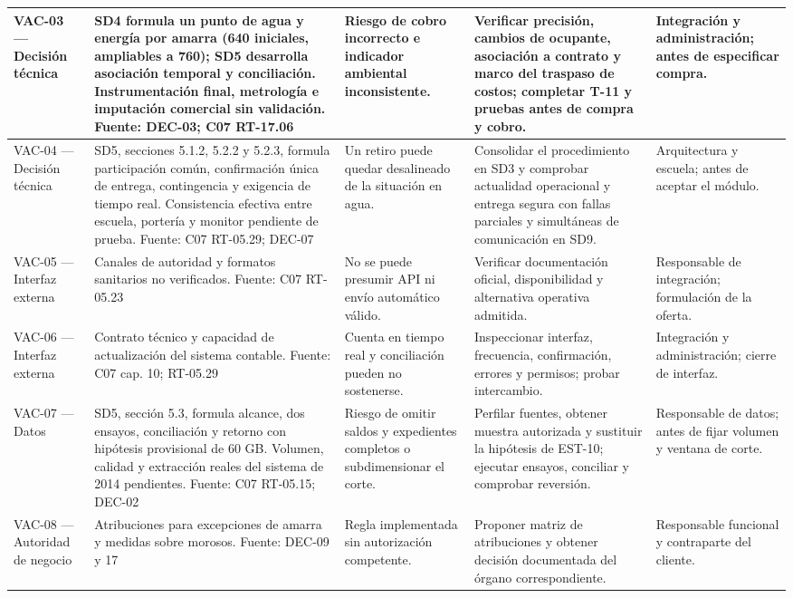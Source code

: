 \begin{longtable}{|L{0.116466\AnchoTablaAnexo}|L{0.297189\AnchoTablaAnexo}|L{0.168675\AnchoTablaAnexo}|L{0.281124\AnchoTablaAnexo}|L{0.136546\AnchoTablaAnexo}|}
VAC-03 — Decisión técnica & SD4 formula un punto de agua y energía por amarra (640 iniciales, ampliables a 760); SD5 desarrolla asociación temporal y conciliación. Instrumentación final, metrología e imputación comercial sin validación. Fuente: DEC-03; C07 RT-17.06 & Riesgo de cobro incorrecto e indicador ambiental inconsistente. & Verificar precisión, cambios de ocupante, asociación a contrato y marco del traspaso de costos; completar T-11 y pruebas antes de compra y cobro. & Integración y administración; antes de especificar compra. \\ \hline
VAC-04 — Decisión técnica & SD5, secciones 5.1.2, 5.2.2 y 5.2.3, formula participación común, confirmación única de entrega, contingencia y exigencia de tiempo real. Consistencia efectiva entre escuela, portería y monitor pendiente de prueba. Fuente: C07 RT-05.29; DEC-07 & Un retiro puede quedar desalineado de la situación en agua. & Consolidar el procedimiento en SD3 y comprobar actualidad operacional y entrega segura con fallas parciales y simultáneas de comunicación en SD9. & Arquitectura y escuela; antes de aceptar el módulo. \\ \hline
{}
VAC-05 — Interfaz externa & Canales de autoridad y formatos sanitarios no verificados. Fuente: C07 RT-05.23 & No se puede presumir API ni envío automático válido. & Verificar documentación oficial, disponibilidad y alternativa operativa admitida. & Responsable de integración; formulación de la oferta. \\ \hline
VAC-06 — Interfaz externa & Contrato técnico y capacidad de actualización del sistema contable. Fuente: C07 cap. 10; RT-05.29 & Cuenta en tiempo real y conciliación pueden no sostenerse. & Inspeccionar interfaz, frecuencia, confirmación, errores y permisos; probar intercambio. & Integración y administración; cierre de interfaz. \\ \hline
{}
VAC-07 — Datos & SD5, sección 5.3, formula alcance, dos ensayos, conciliación y retorno con hipótesis provisional de 60 GB. Volumen, calidad y extracción reales del sistema de 2014 pendientes. Fuente: C07 RT-05.15; DEC-02 & Riesgo de omitir saldos y expedientes completos o subdimensionar el corte. & Perfilar fuentes, obtener muestra autorizada y sustituir la hipótesis de EST-10; ejecutar ensayos, conciliar y comprobar reversión. & Responsable de datos; antes de fijar volumen y ventana de corte. \\ \hline
VAC-08 — Autoridad de negocio & Atribuciones para excepciones de amarra y medidas sobre morosos. Fuente: DEC-09 y 17 & Regla implementada sin autorización competente. & Proponer matriz de atribuciones y obtener decisión documentada del órgano correspondiente. & Responsable funcional y contraparte del cliente. \\ \hline

\end{longtable}
